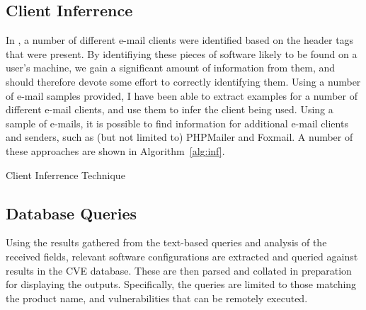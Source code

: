\subsection{Client Inferrence}

In \cite{nurse2015investigating}, a number of different e-mail clients were identified based on the header tags that were present. By identifiying these pieces of software likely to be found on a user's machine, we gain a significant amount of information from them, and should therefore devote some effort to correctly identifying them.  Using a number of e-mail samples provided, I have been able to extract examples for a number of different e-mail clients, and use them to infer the client being used.  Using a sample of e-mails, it is possible to find information for additional e-mail clients and senders, such as (but not limited to) PHPMailer and Foxmail.  A number of these approaches are shown in Algorithm~\ref{alg:inf}.

\begin{algorithm}[!ht]
	\caption{Client Inferrence Technique}
	\label{alg:inf}
\end{algorithm}


\subsection{Database Queries}

Using the results gathered from the text-based queries and analysis of the
received fields, relevant software configurations are extracted and queried
against results in the CVE database.  These are then parsed and collated in
preparation for displaying the outputs. Specifically, the queries are limited
to those matching the product name, and vulnerabilities that can be remotely
executed.

